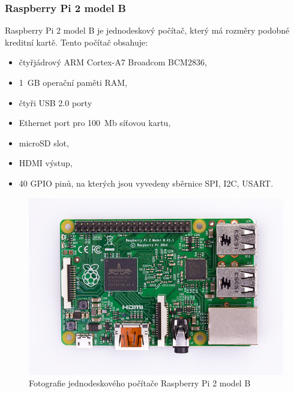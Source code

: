 \documentclass[12pt,a4paper,oneside]{article}
\begin{document}
\subsubsection{Raspberry Pi 2 model B}

Raspberry Pi 2 model B je jednodeskový počítač, který má rozměry podobné kreditní kartě. Tento počítač obsahuje: 

\begin{itemize}
	\renewcommand{\baselinestretch}{1.5}
	\item čtyřjádrový ARM Cortex-A7 Broadcom BCM2836,
	\item 1~GB operační paměti RAM,
	\item čtyři USB 2.0 porty
	\item Ethernet port pro 100~Mb síťovou kartu,
	\item microSD slot,
	\item HDMI výstup,
	\item 40 GPIO pinů, na kterých jsou vyvedeny sběrnice SPI, I2C, USART.
\end{itemize}

\begin{figure}[H]
\centering
\label{fig:foto/rpi2}
\includegraphics[width = 128mm]{img/foto-rpi2.jpg}
\caption{Fotografie jednodeskového počítače Raspberry Pi 2 model B}
\end{figure}
\end{document}
